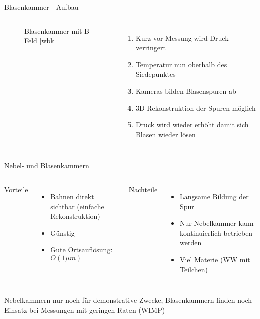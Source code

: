 \begin{frame}{Blasenkammer - Aufbau}
    \begin{columns}[T]
    
			\begin{figure}[htbp]
			  \centering
			  
			  \caption{Blasenkammer mit B-Feld [wbk]}
			\end{figure}
			
	    	\begin{enumerate}
			  \item Kurz vor Messung wird Druck verringert
			  \item Temperatur nun oberhalb des Siedepunktes
			  \item Kameras bilden Blasenspuren ab
			  \item 3D-Rekonstruktion der Spuren möglich
			  \item Druck wird wieder erhöht damit sich Blasen wieder lösen  
			\end{enumerate}
    \end{columns}
\end{frame}


\begin{frame}{Nebel- und Blasenkammern}
    \begin{columns}[T]
			Vorteile		
			\begin{itemize}
			  \item Bahnen direkt sichtbar (einfache Rekonstruktion)
			  \item Günstig
			  \item Gute Ortsauflösung: $O(1 \mu m)$
			\end{itemize}	
	    	Nachteile
	    	\begin{itemize}
			  \item Langsame Bildung der Spur
			  \item Nur Nebelkammer kann kontinuierlich betrieben werden
			  \item Viel Materie (WW mit Teilchen)
			\end{itemize}
    \end{columns}
    \vspace{1cm}
    Nebelkammern nur noch für demonstrative Zwecke, Blasenkammern finden noch
    Einsatz bei Messungen mit geringen Raten (WIMP)
\end{frame}